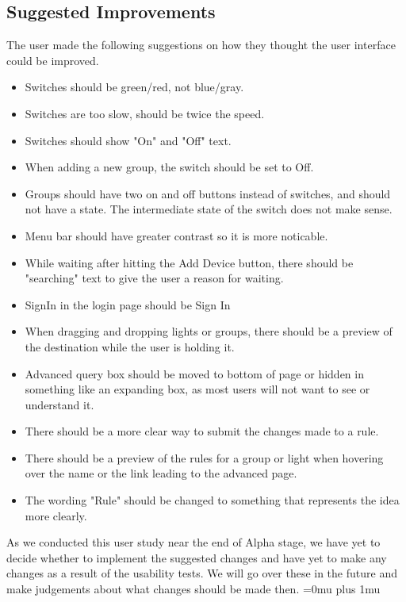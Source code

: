 \documentclass[oneside,openright]{book}
\begin{document}
\subsection{Suggested Improvements}
The user made the following suggestions on how they thought the user interface could be improved.
\begin{itemize}
  \item Switches should be green/red, not blue/gray.
  \item Switches are too slow, should be twice the speed.
  \item Switches should show "On" and "Off" text.
  \item When adding a new group, the switch should be set to Off.
  \item Groups should have two on and off buttons instead of switches, and should not have a state. The intermediate state of the switch does not make sense.
  \item Menu bar should have greater contrast so it is more noticable.
  \item While waiting after hitting the Add Device button, there should be "searching" text to give the user a reason for waiting.
  \item SignIn in the login page should be Sign In
  \item When dragging and dropping lights or groups, there should be a preview of the destination while the user is holding it.
  \item Advanced query box should be moved to bottom of page or hidden in something like an expanding box, as most users will not want to see or understand it.
  \item There should be a more clear way to submit the changes made to a rule.
  \item There should be a preview of the rules for a group or light when hovering over the name or the link leading to the advanced page.
  \item The wording "Rule" should be changed to something that represents the idea more clearly.
\end{itemize}
As we conducted this user study near the end of Alpha stage, we have yet to decide whether to implement the suggested changes and have yet to make any changes as a result of the usability tests. We will go over these in the future and make judgements about what changes should be made then.
\newpage
\Urlmuskip=0mu plus 1mu\relax
{}

\end{document}
